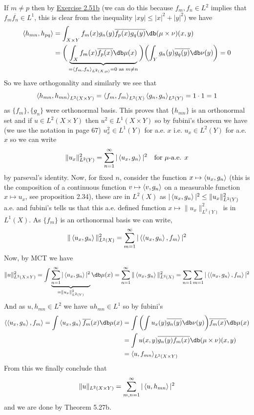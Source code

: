 \documentclass[12pt,a4paper]{article}
\begin{document}
\begin{solution}
    If $m\neq p$ then by \hyperref[prob:2-51]{Exercise 2.51b} (we can do this because $f_m,f_n\in L^2$ implies that $f_m \overline{f_n}\in L^1$, this is clear from the inequality $|xy|\leq|x|^2+|y|^2$) we have 
    \[
        \begin{aligned}
            \ipp{h_{mn},h_{pq}} &= \int_{X\times Y}f_m(x)g_n(y) \overline{f_p(x)g_q(y)}\db(\mu\times\nu)(x,y) \\
                                &= \bigg(\underbrace{\int_Xf_m(x) \overline{f_p(x)}\db\mu(x)}_{=\ipp{f_m,f_n}_{L^2(X,\mu)}=0\text{ as }m\neq n}\bigg)\qty(\int_Yg_n(y) \overline{g_q(y)}\db\nu(y)) =0
        \end{aligned}
    \]
    So we have orthogonality and similarly we see that 
    \[
        \left\langle h_{mn},h_{mn}\right\rangle_{L^2(X\times Y)}=\left\langle f_m,f_m\right\rangle_{L^2(X)}\left\langle g_n,g_n\right\rangle_{L^2(Y)}=1\cdot 1=1
    \]
    as $\{f_m\},\{g_n\}$ were orthonormal basis. 
    This proves that $\{h_{mn}\}$ is an orthonormal set and if $u\in L^2(X\times Y)$ then $u^2\in L^1(X\times Y)$ so by fubini's thoerem we have (we use the notation in page 67) $u_x^2\in L^1(Y)$ for a.e. $x$ i.e. $u_x\in L^2(Y)$ for a.e. $x$ so we can write 
    \[
        \|u_x\|_{L^2(Y)}^2=\sum_{n=1}^\infty|\left\langle u_x,g_n\right\rangle|^2\quad\text{for }\mu\text{-a.e. }x
    \] 
    by parseval's identity. 
    Now, for fixed $n$, consider the function $x\mapsto\left\langle u_x,g_n\right\rangle$ (this is the composition of a continuous function $v\mapsto\left\langle v,g_n\right\rangle$ on a measurable function $x\mapsto u_x$, see proposition 2.34), these are in $L^2(X)$ as $|\left\langle u_x,g_n\right\rangle|^2\leq\|u_x\|_{L^2(Y)}^2$ a.e. and fubini's tells us that this a.e. defined function $x\mapsto\|u_x\|_{L^2(Y)}^2$ is in $L^1(X).$ 
    As $\{f_m\}$ is an orthonormal basis we can write, 
    \[
        \|\left\langle u_x,g_n\right\rangle\|_{L^2(X)}^2=\sum_{m=1}^\infty|\left\langle\left\langle u_x,g_n\right\rangle,f_m\right\rangle|^2
    \]
    Now, by MCT we have 
    \[
        \|u\|_{L^2(X\times Y)}^2=\int\underbrace{\sum_{n=1}^\infty|\ipp{u_x,g_n}|^2}_{=\|u_x\|_{L^2(Y)}^2}\db\mu(x)=\sum_{n=1}^\infty\|\ipp{u_x,g_n}\|_{L^2(X)}^2=\sum_{n=1}\sum_{m=1}|\ipp{\ipp{u_x,g_n},f_m}|^2
    \]
    And as $u,h_{mn}\in L^2$ we have $uh_{mn}\in L^1$ so by fubini's 
    \[
       \begin{aligned}
           \ipp{\ipp{u_x,g_n},f_m}=\int\ipp{u_x,g_n} \overline{f_m}(x)\db\mu(x) &= \int\qty(\int u_x(y) \overline{g_n(y)}\db\nu(y)) \overline{f_m(x)}\db\mu(x) \\
                                                                               &= \int u(x,y) \overline{g_n(y)f_m(x)}\db(\mu\times\nu)(x,y) \\
                                                                               &= \ipp{u,f_{mn}}_{L^2(X\times Y)}
       \end{aligned}
    \]
    From this we finally conclude that 
    \[
        \|u\|_{L^2(X\times Y)}=\sum_{m,n=1}^\infty|\left\langle u,h_{mn}\right\rangle|^2
    \]
    and we are done by Theorem 5.27b.  
\end{solution}
\end{document}
